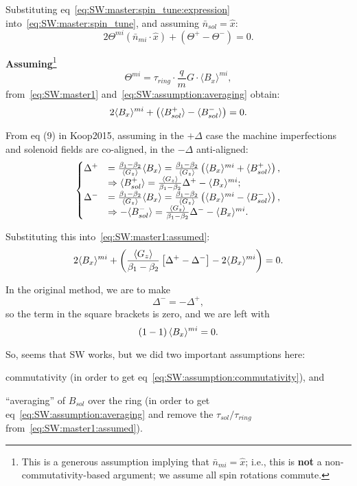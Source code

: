 \documentclass[12pt]{elsarticle}
\newcommand{\nbar}{\bar n}
\newcommand{\D}{\Delta}
\newcommand{\avg}[1]{\langle{#1}\rangle}
\newcommand{\tmi}{\Theta^{mi}}
\newcommand{\nbmi}{\nbar_{mi}}
\newcommand{\tsp}{\Theta^+}
\newcommand{\tsm}{\Theta^-}
\newcommand{\nbsol}{\nbar_{sol}}
\newcommand{\hx}{\hat x}
\newcommand{\tauR}{\tau_{ring}}
\newcommand{\tauS}{\tau_{sol}}
\newcommand{\Bsp}{\avg{B_{sol}^+}}
\newcommand{\Bsm}{\avg{B_{sol}^-}}
\newcommand{\Dbeta}{\beta_1 - \beta_2}
\newcommand{\aGz}{\avg{G_z}}
\begin{document}
Substituting eq~\eqref{eq:SW:master:spin_tune:expression} into~\eqref{eq:SW:master:spin_tune}, and assuming
$\nbsol = \hx$:
\begin{equation}\label{eq:SW:master1}
  2\tmi(\nbmi\cdot\hx) + (\tsp - \tsm) = 0.
\end{equation}

\textbf{Assuming}\footnote{This is a generous assumption implying that $\nbmi = \hx$; i.e., this is \textbf{not}
a non-commutativity-based argument; we assume all spin rotations commute.}
\begin{equation}\label{eq:SW:assumption:commutativity}
\tmi = \tauR\cdot\frac qm G\cdot \avg{B_x}^{mi},
\end{equation}
from~\eqref{eq:SW:master1} and~\eqref{eq:SW:assumption:averaging} obtain:
\begin{equation}\label{eq:SW:master1:assumed}
  2\avg{B_x}^{mi} + \bkt{\Bsp - \Bsm} = 0.
\end{equation}

From eq (9) in Koop2015, assuming in the $+\D$ case the machine imperfections and solenoid fields are co-aligned,
in the $-\D$ anti-aligned:
\begin{equation}\label{eq:SW:Koop2015-9}
  \begin{cases}
    \D^+ &= \frac{\Dbeta}{\aGz}\avg{B_x} = \frac{\Dbeta}{\aGz}\bkt{\avg{B_x}^{mi} + \Bsp}, \\
    &\Rightarrow \Bsp = \frac{\aGz}{\Dbeta}\D^+ - \avg{B_x}^{mi}; \\
    \D^- &= \frac{\Dbeta}{\aGz}\avg{B_x} = \frac{\Dbeta}{\aGz}\bkt{\avg{B_x}^{mi} - \Bsm}, \\
    &\Rightarrow -\Bsm = \frac{\aGz}{\Dbeta}\D^- - \avg{B_x}^{mi}.
  \end{cases}
\end{equation}

Substituting this into~\eqref{eq:SW:master1:assumed}:
\[
2\avg{B_x}^{mi} + \bkt{\frac{\aGz}{\Dbeta}\bkt*{\D^+ - \D^-} - 2\avg{B_x}^{mi}} = 0.
\]

In the original method, we are to make 
\begin{equation}\label{eq:SW:method_condition}
  \D^- = - \D^+,
\end{equation}
so the term in the square brackets is zero, and we are left with
\begin{equation}\label{eq:SW:conclusion}
  \bkt{1 - 1}\avg{B_x}^{mi} = 0.
\end{equation}

So, seems that SW works, but we did two important assumptions here:
\begin{enumerate*}[(a)]
  \item commutativity (in order to get eq~\eqref{eq:SW:assumption:commutativity}), and
  \item ``averaging'' of $B_{sol}$ over the ring (in order to get eq~\eqref{eq:SW:assumption:averaging}
    and remove the $\tauS/\tauR$ from~\eqref{eq:SW:master1:assumed}).
\end{enumerate*}
\end{document}
